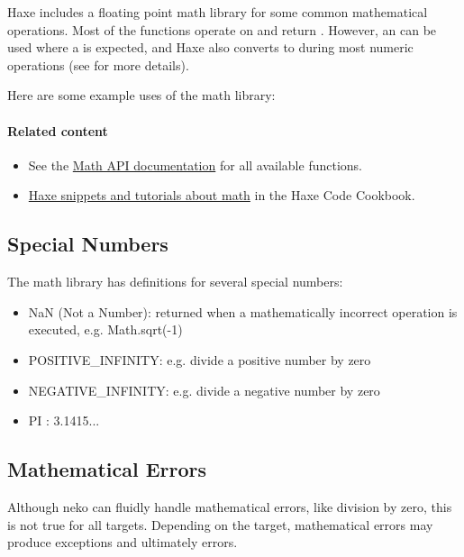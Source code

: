 Haxe includes a floating point math library for some common mathematical operations. Most of the functions operate on and return . However, an  can be used where a  is expected, and Haxe also converts  to  during most numeric operations  (see  for more details).

Here are some example uses of the math library:  


\paragraph{Related content}
\begin{itemize}
	\item See the \href{https://api.haxe.org/Math.html}{Math API documentation} for all available functions.
	\item \href{http://code.haxe.org/tag/math.html}{Haxe snippets and tutorials about math} in the Haxe Code Cookbook.
\end{itemize}

\subsection{Special Numbers}
\label{std-math-special-numbers}

The math library has definitions for several special numbers:

\begin{itemize}
	\item NaN (Not a Number): returned when a mathematically incorrect operation is executed, e.g. Math.sqrt(-1)
	\item POSITIVE_INFINITY: e.g. divide a positive number by zero
	\item NEGATIVE_INFINITY: e.g. divide a negative number by zero
	\item PI : 3.1415...
\end{itemize}

\subsection{Mathematical Errors}
\label{std-math-mathematical-errors}
Although neko can fluidly handle mathematical errors, like division by zero, this is not true for all targets.  Depending on the target, mathematical errors may produce exceptions and ultimately errors.

